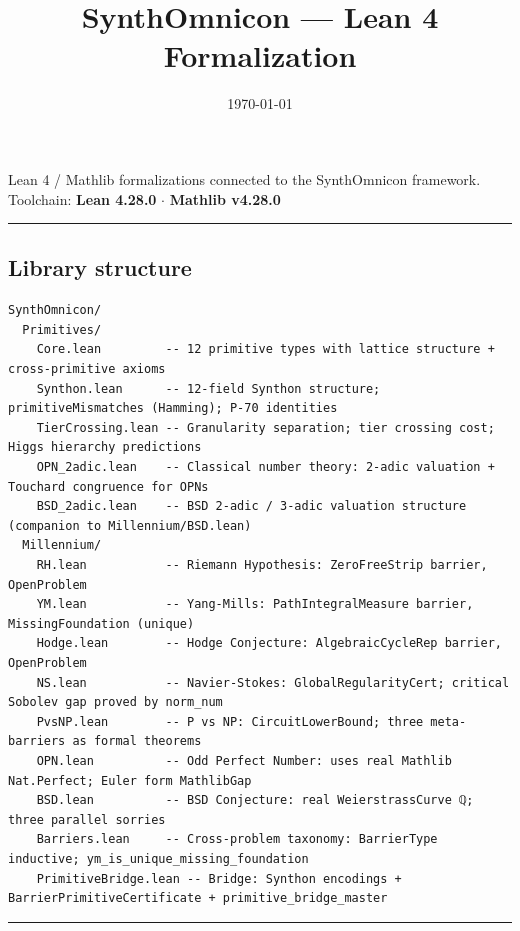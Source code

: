 \documentclass[11pt,a4paper]{article}
\begin{document}
\title{SynthOmnicon --- Lean 4 Formalization}
\date{\today}

\maketitle

Lean 4 / Mathlib formalizations connected to the SynthOmnicon framework.
Toolchain: \textbf{Lean 4.28.0} $\cdot$ \textbf{Mathlib v4.28.0}

\begin{center}
\rule{0.5\textwidth}{0.4pt}
\end{center}

\subsection{Library structure}

\begin{lstlisting}
SynthOmnicon/
  Primitives/
    Core.lean         -- 12 primitive types with lattice structure + cross-primitive axioms
    Synthon.lean      -- 12-field Synthon structure; primitiveMismatches (Hamming); P-70 identities
    TierCrossing.lean -- Granularity separation; tier crossing cost; Higgs hierarchy predictions
    OPN_2adic.lean    -- Classical number theory: 2-adic valuation + Touchard congruence for OPNs
    BSD_2adic.lean    -- BSD 2-adic / 3-adic valuation structure (companion to Millennium/BSD.lean)
  Millennium/
    RH.lean           -- Riemann Hypothesis: ZeroFreeStrip barrier, OpenProblem
    YM.lean           -- Yang-Mills: PathIntegralMeasure barrier, MissingFoundation (unique)
    Hodge.lean        -- Hodge Conjecture: AlgebraicCycleRep barrier, OpenProblem
    NS.lean           -- Navier-Stokes: GlobalRegularityCert; critical Sobolev gap proved by norm_num
    PvsNP.lean        -- P vs NP: CircuitLowerBound; three meta-barriers as formal theorems
    OPN.lean          -- Odd Perfect Number: uses real Mathlib Nat.Perfect; Euler form MathlibGap
    BSD.lean          -- BSD Conjecture: real WeierstrassCurve ℚ; three parallel sorries
    Barriers.lean     -- Cross-problem taxonomy: BarrierType inductive; ym_is_unique_missing_foundation
    PrimitiveBridge.lean -- Bridge: Synthon encodings + BarrierPrimitiveCertificate + primitive_bridge_master
\end{lstlisting}

\begin{center}
\rule{0.5\textwidth}{0.4pt}
\end{center}
\end{document}
